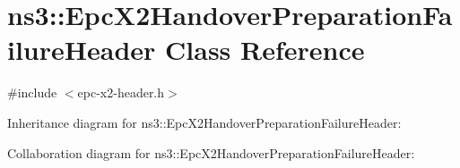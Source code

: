 \hypertarget{classns3_1_1EpcX2HandoverPreparationFailureHeader}{}\section{ns3\+:\+:Epc\+X2\+Handover\+Preparation\+Failure\+Header Class Reference}
\label{classns3_1_1EpcX2HandoverPreparationFailureHeader}


{\ttfamily \#include $<$epc-\/x2-\/header.\+h$>$}



Inheritance diagram for ns3\+:\+:Epc\+X2\+Handover\+Preparation\+Failure\+Header\+:


Collaboration diagram for ns3\+:\+:Epc\+X2\+Handover\+Preparation\+Failure\+Header\+:
